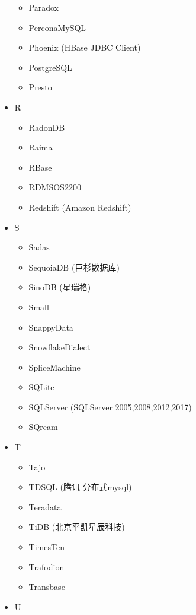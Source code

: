 \documentclass[
]{book}
\providecommand{\tightlist}{%
  \setlength{\itemsep}{0pt}\setlength{\parskip}{0pt}}
\begin{document}
\begin{itemize}
  \begin{itemize}
  \tightlist
  \item
    Paradox
  \item
    PerconaMySQL
  \item
    Phoenix (HBase JDBC Client)
  \item
    PostgreSQL
  \item
    Presto
  \end{itemize}
\item
  R

  \begin{itemize}
  \tightlist
  \item
    RadonDB
  \item
    Raima
  \item
    RBase
  \item
    RDMSOS2200
  \item
    Redshift (Amazon Redshift)
  \end{itemize}
\item
  S

  \begin{itemize}
  \tightlist
  \item
    Sadas
  \item
    SequoiaDB (巨杉数据库)
  \item
    SinoDB (星瑞格)
  \item
    Small
  \item
    SnappyData
  \item
    SnowflakeDialect
  \item
    SpliceMachine
  \item
    SQLite
  \item
    SQLServer (SQLServer 2005,2008,2012,2017)
  \item
    SQream
  \end{itemize}
\item
  T

  \begin{itemize}
  \tightlist
  \item
    Tajo
  \item
    TDSQL (腾讯 分布式mysql)
  \item
    Teradata
  \item
    TiDB (北京平凯星辰科技)
  \item
    TimesTen
  \item
    Trafodion
  \item
    Transbase
  \end{itemize}
\item
  U


\end{itemize}
\end{document}
